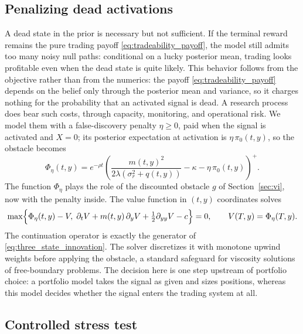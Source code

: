 \documentclass[11pt]{article}
\begin{document}
\subsection{Penalizing dead activations}

A dead state in the prior is necessary but not sufficient.  If the terminal reward
remains the pure trading payoff \eqref{eq:tradeability_payoff}, the model still admits
too many noisy null paths: conditional on a lucky posterior mean, trading looks
profitable even when the dead state is quite likely.  This behavior follows from the
objective rather than from the numerics: the payoff \eqref{eq:tradeability_payoff}
depends on the belief only through the posterior mean and variance, so it charges nothing
for the probability that an activated signal is dead.  A research process does bear
such costs, through capacity, monitoring, and operational risk.  We model them with a
false-discovery penalty $\eta\ge0$, paid when the signal is activated and $X=0$; its
posterior expectation at activation is $\eta\,\pi_0(t,y)$, so the obstacle becomes
\begin{equation}
    \Phi_\eta(t,y)
    =
    e^{-\rho t}
    \left(
        \frac{m(t,y)^2}{2\lambda(\sigma_r^2+q(t,y))}-\kappa-\eta\,\pi_0(t,y)
    \right)^{\!+}.
    \label{eq:dead_alive_payoff}
\end{equation}
The function $\Phi_\eta$ plays the role of the discounted obstacle $g$ of
Section~\ref{sec:vi}, now with the penalty inside.  The value function in $(t,y)$
coordinates solves
\begin{equation}
    \max\Bigl\{
        \Phi_\eta(t,y)-V,\;
        \partial_tV+m(t,y)\,\partial_yV+\tfrac12\partial_{yy}V-c
    \Bigr\}=0,
    \qquad
    V(T,y)=\Phi_\eta(T,y).
    \label{eq:three_state_vi}
\end{equation}
The continuation operator is exactly the generator of
\eqref{eq:three_state_innovation}.  The solver discretizes it with monotone upwind
weights before applying the obstacle, a standard safeguard for viscosity solutions
of free-boundary problems.  The decision here is one step upstream of portfolio
choice: a portfolio model takes the signal as given and sizes positions, whereas this
model decides whether the signal enters the trading system at all.

\subsection{Controlled stress test}
\label{sec:deadalive_test}
\end{document}

